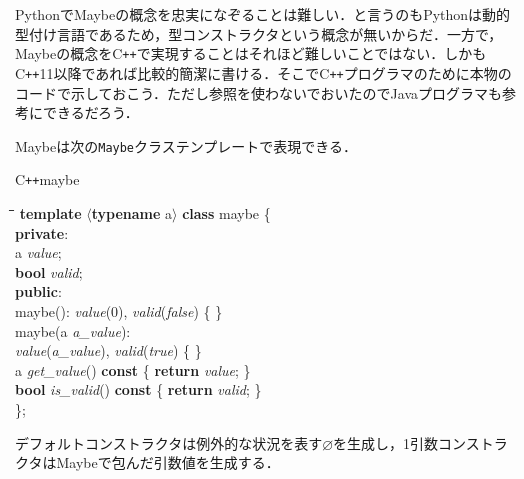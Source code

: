 \documentclass[twocolumn]{jsbook}
\newcommand{\cxx}{\textrm{C}\texttt{++}}
\newcommand{\code}[1]{\texttt{#1}}
\newenvironment{cxxcode}{\begin{itembox}[r]{\cxx}}{\end{itembox}}
\newenvironment{python}{\begin{tabbing}\hspace*{1em}\=\hspace*{1em}\=\hspace*{1em}\=\hspace*{1em}\=\kill}{\end{tabbing}}
\newcommand{\pthnClassname}[1]{\textrm{#1}}
\newcommand{\pthnId}[1]{\textit{#1}}
\newcommand{\pthnKeyword}[1]{\textbf{#1}}
\newcommand{\hsklNothing}{\varnothing}
\begin{document}


PythonでMaybeの概念を忠実になぞることは難しい．と言うのもPythonは動的型付け言語であるため，型コンストラクタという概念が無いからだ．一方で，Maybeの概念を\cxx で実現することはそれほど難しいことではない．しかも\cxx11以降であれば比較的簡潔に書ける．そこで\cxx プログラマのために本物のコードで示しておこう．ただし参照を使わないでおいたのでJavaプログラマも参考にできるだろう．

Maybeは次の\code{Maybe}クラステンプレートで表現できる．
\begin{cxxcode}maybe
\begin{python}
\pthnKeyword{template} $\langle$\pthnKeyword{typename} \pthnClassname{a}$\rangle$ \pthnKeyword{class} \pthnClassname{maybe} \{\\
\pthnKeyword{private}:\\
\>\pthnClassname{a} \pthnId{value};\\
\>\pthnKeyword{bool} \pthnId{valid};\\
\pthnKeyword{public}:\\
\>\pthnClassname{maybe}(): \pthnId{value}($0$), \pthnId{valid}(\pthnId{false}) \{ \}\\
\>\pthnClassname{maybe}(\pthnClassname{a} \pthnId{a\_value}):\\
\>\>\pthnId{value}(\pthnId{a\_value}), \pthnId{valid}(\pthnId{true}) \{ \}\\
\>\pthnClassname{a} \pthnId{get\_value}() \pthnKeyword{const} \{ \pthnKeyword{return} \pthnId{value}; \}\\
\>\pthnKeyword{bool} \pthnId{is\_valid}() \pthnKeyword{const} \{ \pthnKeyword{return} \pthnId{valid}; \}\\
\};
\end{python}
\end{cxxcode}
デフォルトコンストラクタは例外的な状況を表す$\hsklNothing$を生成し，1引数コンストラクタはMaybeで包んだ引数値を生成する．
\end{document}
